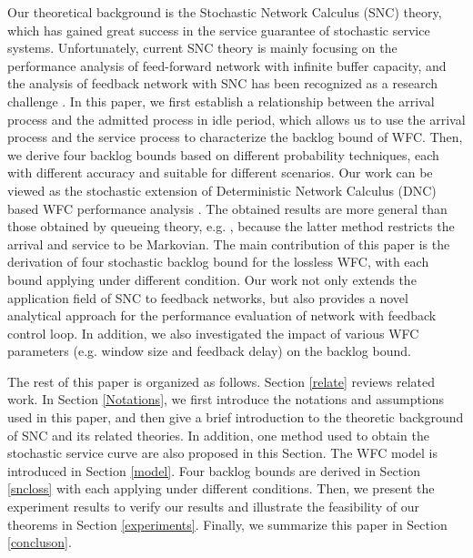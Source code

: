 \documentclass[paper]{ieice}
\begin{document}
Our theoretical background is the Stochastic Network Calculus (SNC) \cite{Chan94,jiang2006basic,Ciucu2006Scaling,5984844,Fidl06} theory, which has gained great success in the service guarantee of stochastic service systems. Unfortunately, current SNC theory is mainly focusing on the performance analysis of feed-forward network with infinite buffer capacity, and the analysis of feedback network with SNC has been recognized as a research challenge \cite{JiangLiu-15877}. In this paper, we first establish a relationship between the arrival process and the admitted process in idle period, which allows us to use the arrival process and the service process to characterize the backlog bound of WFC. Then, we derive four backlog bounds based on different probability techniques, each with different accuracy and suitable for different scenarios. Our work can be viewed as the stochastic extension of Deterministic Network Calculus (DNC) based WFC performance analysis \cite{CrOk96,AgRa96,Chan98,ACOR99,QLDD09FC,bose2006analysis,Qian2010Analysis}. The obtained results are more general than those obtained by queueing theory, e.g. \cite{1095377,jung1996analysis}, because the latter method restricts the arrival and service to be Markovian. The main contribution of this paper is the derivation of four stochastic backlog bound for the lossless WFC, with each bound applying under different condition. Our work not only extends the application field of SNC to feedback networks, but also provides a novel analytical approach for the performance evaluation of network with feedback control loop. In addition, we also investigated the impact of various WFC parameters (e.g. window size and feedback delay) on the backlog bound.

The rest of this paper is organized as follows. Section \ref{relate} reviews related work. In Section \ref{Notations}, we first introduce the notations and assumptions used in this paper, and then give a brief introduction to the theoretic background of SNC and its related theories. In addition, one method used to obtain the stochastic service curve are also proposed in this Section. The WFC model is introduced in Section \ref{model}. Four backlog bounds are derived in Section \ref{sncloss} with each applying under different conditions. Then, we present the experiment results to verify our results and illustrate the feasibility of our theorems in Section \ref{experiments}. Finally, we summarize this paper in Section \ref{concluson}.
\end{document}

